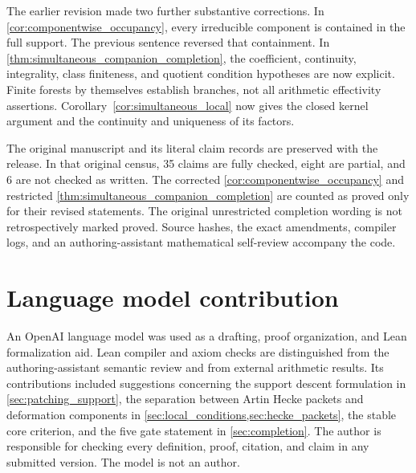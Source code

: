 \documentclass[11pt]{amsart}
\theoremstyle{definition}
\theoremstyle{remark}
\begin{document}
The earlier revision made two further substantive corrections. In \cref{cor:componentwise_occupancy}, every irreducible component is contained in the full support. The previous sentence reversed that containment. In \cref{thm:simultaneous_companion_completion}, the coefficient, continuity, integrality, class finiteness, and quotient condition hypotheses are now explicit. Finite forests by themselves establish branches, not all arithmetic effectivity assertions. Corollary~\ref{cor:simultaneous_local} now gives the closed kernel argument and the continuity and uniqueness of its factors.

The original manuscript and its literal claim records are preserved with the release. In that original census, 35 claims are fully checked, eight are partial, and 6 are not checked as written. The corrected \cref{cor:componentwise_occupancy} and restricted \cref{thm:simultaneous_companion_completion} are counted as proved only for their revised statements. The original unrestricted completion wording is not retrospectively marked proved. Source hashes, the exact amendments, compiler logs, and an authoring-assistant mathematical self-review accompany the code.

\section*{Language model contribution}

An OpenAI language model was used as a drafting, proof organization, and Lean formalization aid. Lean compiler and axiom checks are distinguished from the authoring-assistant semantic review and from external arithmetic results. Its contributions included suggestions concerning the support descent formulation in \cref{sec:patching_support}, the separation between Artin Hecke packets and deformation components in \cref{sec:local_conditions,sec:hecke_packets}, the stable core criterion, and the five gate statement in \cref{sec:completion}. The author is responsible for checking every definition, proof, citation, and claim in any submitted version. The model is not an author.



\end{document}
